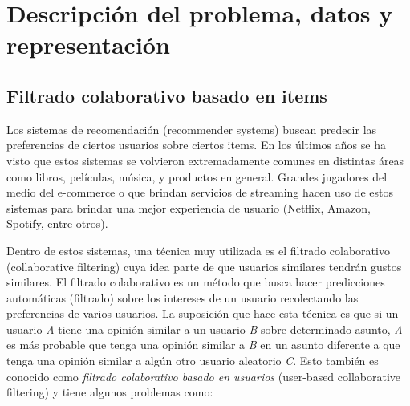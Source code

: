 \documentclass[11pt, a4paper]{article}
\begin{document}
 
  \section{Descripción del problema, datos y representación}\label{sec:problema}

  \subsection{Filtrado colaborativo basado en items}

  Los sistemas de recomendación (recommender systems) buscan predecir las
  preferencias de ciertos usuarios sobre ciertos items. En los últimos años se
  ha visto que estos sistemas se volvieron extremadamente comunes en distintas
  áreas como libros, películas, música, y productos en general. Grandes
  jugadores del medio del e-commerce o que brindan servicios de streaming hacen
  uso de estos sistemas para brindar una mejor experiencia de usuario (Netflix,
  Amazon, Spotify, entre otros).

  Dentro de estos sistemas, una técnica muy utilizada es el filtrado
  colaborativo (collaborative filtering) cuya idea parte de que usuarios
  similares tendrán gustos similares. El filtrado colaborativo es un método que
  busca hacer predicciones automáticas (filtrado) sobre los intereses de un
  usuario recolectando las preferencias de varios usuarios. La suposición que
  hace esta técnica es que si un usuario {\it A} tiene una opinión similar a un
  usuario {\it B} sobre determinado asunto, {\it A} es más probable que tenga
  una opinión similar a {\it B} en un asunto diferente a que tenga una opinión
  similar a algún otro usuario aleatorio {\it C}. Esto también es conocido como
  {\em filtrado colaborativo basado en usuarios} (user-based collaborative
  filtering) y tiene algunos problemas como:
\end{document}
